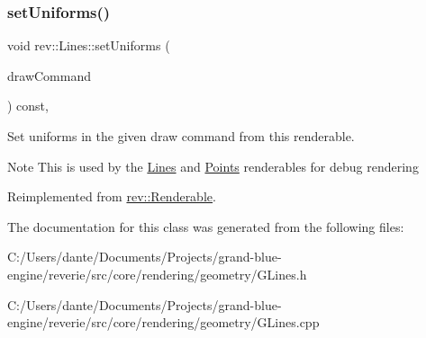 \subsubsection{\texorpdfstring{setUniforms()}{setUniforms()}}
{\footnotesize\ttfamily void rev\+::\+Lines\+::set\+Uniforms (\begin{DoxyParamCaption}\item[{\mbox{\hyperlink{classrev_1_1_draw_command}{Draw\+Command}} \&}]{draw\+Command }\end{DoxyParamCaption}) const\hspace{0.3cm}{\ttfamily [override]}, {\ttfamily [virtual]}}



Set uniforms in the given draw command from this renderable. 

\begin{DoxyNote}{Note}
This is used by the \mbox{\hyperlink{classrev_1_1_lines}{Lines}} and \mbox{\hyperlink{classrev_1_1_points}{Points}} renderables for debug rendering 
\end{DoxyNote}


Reimplemented from \mbox{\hyperlink{classrev_1_1_renderable_a4418624ac4442899026f95c20e065467}{rev\+::\+Renderable}}.



The documentation for this class was generated from the following files\+:\begin{DoxyCompactItemize}
\item 
C\+:/\+Users/dante/\+Documents/\+Projects/grand-\/blue-\/engine/reverie/src/core/rendering/geometry/G\+Lines.\+h\item 
C\+:/\+Users/dante/\+Documents/\+Projects/grand-\/blue-\/engine/reverie/src/core/rendering/geometry/G\+Lines.\+cpp\end{DoxyCompactItemize}
